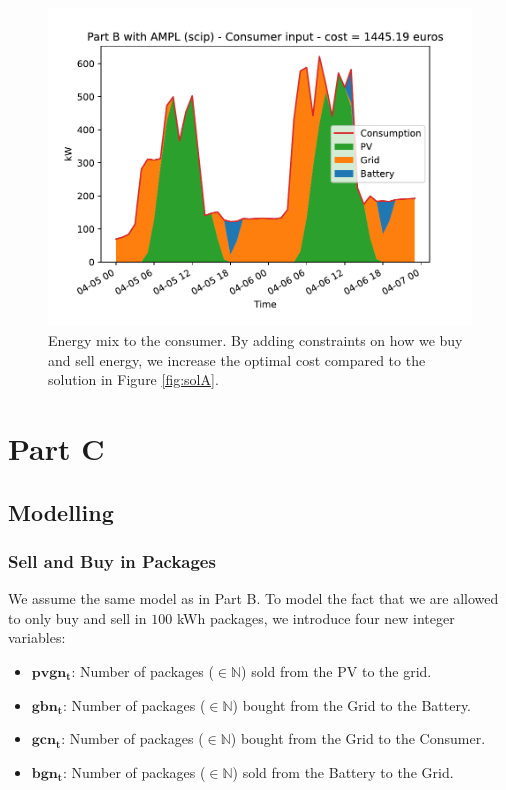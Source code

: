 \documentclass[12pt]{article}
\newcommand{\VAR}[1]{\mathbf{#1}}
\begin{document}
\begin{figure}[p]
    \centering
    \includegraphics[width=\textwidth]{PartB/consumer_input}
    \caption{Energy mix to the consumer. By adding constraints on how we buy and sell energy, we increase the optimal cost compared to the solution in Figure \ref{fig:solA}.}
\end{figure}

\pagebreak

\section{Part C}

\subsection{Modelling}

\subsubsection{Sell and Buy in Packages}
We assume the same model as in Part B. To model the fact that we are allowed to only buy and sell in \(100\) kWh packages, we introduce four new integer variables:
\begin{itemize}
    \item \(\VAR{pvgn_t}\): Number of packages (\(\in \mathbb{N}\)) sold from the PV to the grid.
    \item \(\VAR{gbn_t}\): Number of packages (\(\in \mathbb{N}\)) bought from the Grid to the Battery.
    \item \(\VAR{gcn_t}\): Number of packages (\(\in \mathbb{N}\)) bought from the Grid to the Consumer.
    \item \(\VAR{bgn_t}\): Number of packages (\(\in \mathbb{N}\)) sold from the Battery to the Grid.
\end{itemize}
\end{document}
